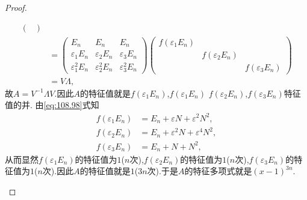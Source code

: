 \documentclass[../../main.tex]{subfiles}%
\begin{document}
\begin{proof}
\begin{enumerate}[(1)]
\begin{align*}
\begin{pmatrix}
\end{pmatrix} \\
&= \begin{pmatrix}
E_n & E_n & E_n\\
\varepsilon_1 E_n & \varepsilon_2 E_n & \varepsilon_3 E_n\\
\varepsilon_1^2 E_n & \varepsilon_2^2 E_n & \varepsilon_3^2 E_n
\end{pmatrix} \begin{pmatrix}
f(\varepsilon_1 E_n) & & \\
& f(\varepsilon_2 E_n) & \\
& & f(\varepsilon_3 E_n)
\end{pmatrix}\\
& = V\Lambda,
\end{align*}
故$A = V^{-1}\Lambda V$.因此$A$的特征值就是$f(\varepsilon_1 E_n)$,$f(\varepsilon_1 E_n)$ $f(\varepsilon_2 E_n)$,$f(\varepsilon_3 E_n)$特征值的并.
由\eqref{eq:108.98}式知
\begin{align*}
f(\varepsilon_1 E_n) &=  E_n + \varepsilon N + \varepsilon^2 N^2, \\
f(\varepsilon_2 E_n) &=  E_n + \varepsilon^2 N + \varepsilon^4 N^2, \\
f(\varepsilon_3 E_n) &= E_n + N + N^2,
\end{align*}
从而显然$f(\varepsilon_1 E_n)$的特征值为$1$($n$次),$f(\varepsilon_2 E_n)$的特征值为$1$($n$次),$f(\varepsilon_3 E_n)$的特征值为$1$($n$次).因此$A$的特征值就是$1$($3n$次).于是$A$的特征多项式就是$(x - 1)^{3n} $.
\end{enumerate}

\end{proof}
\end{document}
